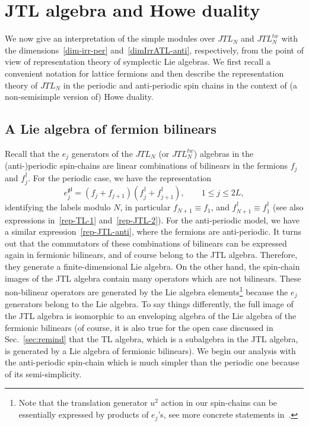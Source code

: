 \documentclass[11pt]{article}
\newcommand{\JTL}[1]{JTL_{#1}}
\newcommand{\gl}{\mathfrak{gl}}
\theoremstyle{definition}
\begin{document}

\section{JTL algebra and Howe duality}\label{Howe}

We now give an interpretation of the simple modules over
 $\JTL{N}$ and $\JTL{N}^{tw}$ with the dimensions~\eqref{dim-irr-per}
and~\eqref{dimIrrATL-anti}, respectively, from the point of view of  representation  theory of
 symplectic Lie algebras.
 We first recall a convenient  notation for  lattice fermions and then describe the representation theory of $\JTL{N}$ in the periodic and anti-periodic spin chains in the  context of (a non-semisimple version of)
 Howe duality.

 \subsection{A Lie algebra of fermion bilinears}\label{Howe-ss-0}
Recall that the $e_j$ generators of the $\JTL{N}$ (or $\JTL{N}^{tw}$) algebras in the (anti-)periodic spin-chains are linear combinations of bilinears in the fermions $f_j$ and $f_j^{\dagger}$. For the periodic case, we have the representation
\begin{equation*}
e_j^{\gl}= (f_j+f_{j+1})(f_j^\dagger+f_{j+1}^\dagger),\qquad 1\leq
j\leq 2L,
\end{equation*}
identifying the labels modulo $N$, in particular $f_{N+1}\equiv
f_1$, and $f^\dagger_{N+1}\equiv f_1^\dagger$
 (see also expressions in~\eqref{rep-TL-1} and~\eqref{rep-JTL-2}).  For the anti-periodic model, we have a similar expression~\eqref{rep-JTL-anti}, where the fermions are anti-periodic. It turns out that the commutators of these combinations of bilinears can be expressed again in fermionic bilinears, and of course   belong to the JTL algebra. Therefore, they generate a finite-dimensional Lie algebra. On the other hand, the spin-chain images of the JTL algebra contain many operators which are not bilinears. These non-bilinear operators are generated by the Lie algebra elements\footnote{Note that the translation generator $u^2$ action in our spin-chains  can be essentially expressed by products of $e_j$'s, see more concrete statements in~\cite{GRS1,GRS2}.} because the $e_j$ generators belong to the Lie algebra. To say things differently, the full image of  the JTL algebra is isomorphic to an enveloping algebra of the Lie algebra of the fermionic bilinears (of course, it is also true for the open case discussed in Sec.~\ref{sec:remind} that the TL algebra, which is a subalgebra in the JTL algebra, is  generated by a Lie algebra of fermionic bilinears).
We begin our analysis with the anti-periodic spin-chain which is much simpler  than the periodic one because of its semi-simplicity.
\end{document}
